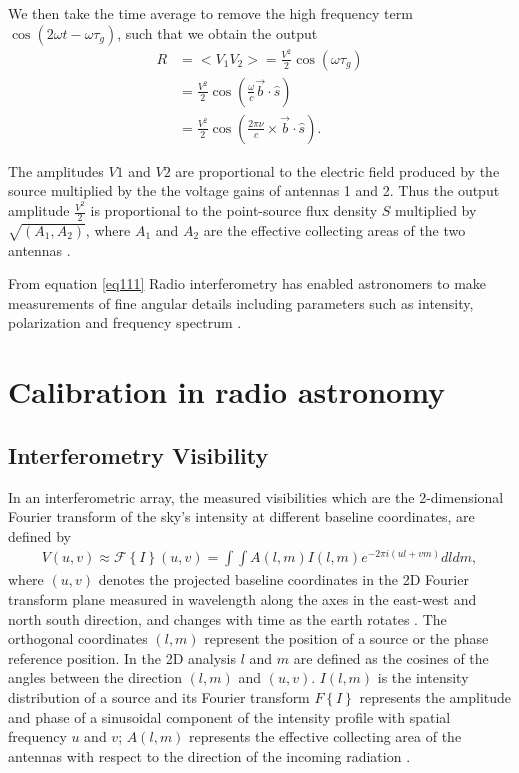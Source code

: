 We then take the time average to remove the high frequency term $\cos(2\omega t - \omega \tau_{g})$, such that we obtain the output 
\begin{align}
R&= <V_1V_2> = \frac{V^2}{2}  \cos (\omega\tau_{g})\\
  &= \frac{V^2}{2}  \cos \left( \frac{\omega}{c} \overrightarrow{b} \cdot \widehat{s} \right)\\
   &= \frac{V^2}{2}  \cos \left( \frac{2\pi \nu}{c} \times
   \overrightarrow{b} \cdot \widehat{s} \right). 
\end{align}

The amplitudes $V1$ and $V2$ are proportional to the electric field produced by the  source multiplied by the the voltage gains of antennas 1 and 2. Thus the output amplitude $\frac{V^2}{2}$ is proportional to the point-source flux density $S$ multiplied by $\sqrt{(A_1, A_2)}$, where $A_1$ and $A_2$ are the effective collecting areas of the two antennas \citep{NRAO}.

From equation \ref{eq111} 
Radio interferometry has enabled astronomers to make measurements of fine angular  details including parameters such as intensity, polarization and frequency spectrum \citep{thompson2001interferometry}.

\section{Calibration in radio astronomy}
\label{Calibr}
\subsection{Interferometry Visibility}
In an interferometric array, the measured visibilities  which are the 2-dimensional Fourier transform of the sky's intensity at different baseline coordinates, are defined by
\begin{align}
V(u,v)\approx \mathcal{F}\left\{I\right\}(u,v)=\int \int A(l,m) I (l,m)e^{-2\pi i(ul+vm)} dl dm,
\label{Vis}
\end{align}
where $(u,v)$ denotes the projected baseline coordinates in the 2D Fourier transform plane  measured in wavelength along the axes in the east-west and north south direction, and changes with time as the earth rotates  \citep{taylor1999synthesis}. The orthogonal coordinates $(l, m)$ represent the position of a source or the phase reference position. In the 2D analysis $l$ and $m$ are defined as the cosines of the  angles between the direction $(l,m)$ and $(u, v)$. $I(l,m)$ is the intensity distribution of a source and its Fourier transform  ${F}\left\{I\right\}$ represents the amplitude and phase of a sinusoidal component of the intensity profile with spatial frequency $u$ and $v$; $A(l, m)$ represents the effective collecting area of the antennas with respect to the direction of the incoming radiation \citep{thompson2001interferometry}.

